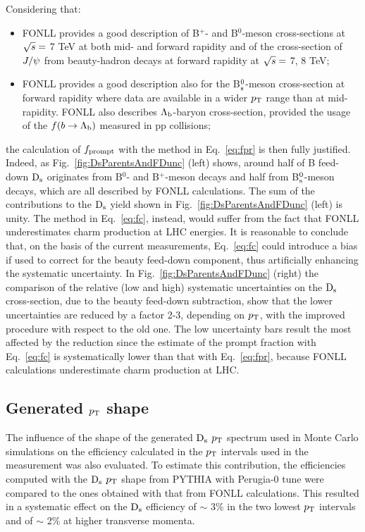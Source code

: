 Considering that:
\begin{itemize}
\item FONLL provides a good description of B$^{+}$- and B$^{0}$-meson 
cross-sections at $\sqrt{s} =$ 7 TeV at both mid- and forward rapidity and of 
the cross-section of $J/{\rm \psi}$ from beauty-hadron decays at forward rapidity at  $\sqrt{s} =$ 7, 8 TeV;
\item FONLL provides a good description also for the 
B$^0_{\rm s}$-meson cross-section at forward rapidity where data are available in a wider $p_{\rm T}$ range 
than at mid-rapidity. FONLL also describes 
$\Lambda_{\rm b}$-baryon cross-section, provided 
the usage of the $f(b\rightarrow \Lambda_{\rm b})$ measured in pp collisions;
\end{itemize}
the calculation of $f_{\rm prompt}$ with the method in Eq.~\ref{eq:fpr} is then fully justified.
Indeed, as Fig.~\ref{fig:DsParentsAndFDunc} (left) shows, around half of B feed-down 
${\rm D_s}$ originates from B$^0$- and B$^+$-meson decays 
and half from B$^0_{\rm s}$-meson decays, which are all described
by FONLL calculations. The sum of the contributions to the ${\rm D_s}$ yield shown in Fig.~\ref{fig:DsParentsAndFDunc} (left) is unity.
The method in Eq.~\ref{eq:fc}, instead, would suffer from the 
fact that FONLL underestimates charm production at LHC energies. 
It is reasonable to conclude that, on the basis of the current 
measurements, Eq.~\ref{eq:fc} could introduce a bias if 
used to correct for the beauty feed-down component, thus artificially enhancing 
the systematic uncertainty. In Fig.~\ref{fig:DsParentsAndFDunc} (right) the comparison of the 
relative (low and high) systematic uncertainties on the ${\rm D_s}$ cross-section, 
due to the beauty feed-down subtraction, show that the lower uncertainties are reduced by a factor 2-3, 
depending on $p_{\rm T}$, with the improved procedure with respect to the old one.
The low uncertainty bars result the most affected by the reduction since the estimate of the prompt
fraction with Eq.~\ref{eq:fc} is systematically lower than that with Eq.~\ref{eq:fpr},
because FONLL calculations underestimate charm production at LHC.

\subsection{Generated $p_{\rm T}$ shape}
\label{subsec:MCptshapePP}
The influence of the shape of the generated ${\rm D_s}$ $p_{\rm T}$ spectrum used in 
Monte Carlo simulations on the efficiency calculated in the $p_{\rm T}$ intervals used
in the measurement was also evaluated. 
To estimate this contribution, the efficiencies computed with the ${\rm D_s}$ $p_{\rm T}$ shape from PYTHIA with Perugia-0 tune
were compared to the ones obtained with that from FONLL calculations. 
This resulted in a systematic effect on the ${\rm D_s}$ efficiency of $\sim$ 3\% 
in the two lowest $p_{\rm T}$ intervals and of $\sim$ 2\% at higher transverse momenta.\\

